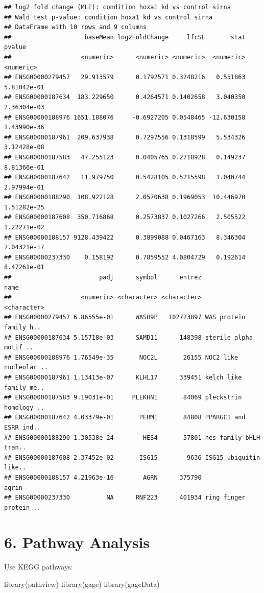 \documentclass[
]{article}
\newenvironment{Shaded}{\begin{snugshade}}{\end{snugshade}}
\newcommand{\FunctionTok}[1]{\textcolor[rgb]{0.00,0.00,0.00}{#1}}
\newcommand{\NormalTok}[1]{#1}
\begin{document}
\begin{verbatim}
## log2 fold change (MLE): condition hoxa1 kd vs control sirna 
## Wald test p-value: condition hoxa1 kd vs control sirna 
## DataFrame with 10 rows and 9 columns
##                    baseMean log2FoldChange     lfcSE       stat      pvalue
##                   <numeric>      <numeric> <numeric>  <numeric>   <numeric>
## ENSG00000279457   29.913579      0.1792571 0.3248216   0.551863 5.81042e-01
## ENSG00000187634  183.229650      0.4264571 0.1402658   3.040350 2.36304e-03
## ENSG00000188976 1651.188076     -0.6927205 0.0548465 -12.630158 1.43990e-36
## ENSG00000187961  209.637938      0.7297556 0.1318599   5.534326 3.12428e-08
## ENSG00000187583   47.255123      0.0405765 0.2718928   0.149237 8.81366e-01
## ENSG00000187642   11.979750      0.5428105 0.5215598   1.040744 2.97994e-01
## ENSG00000188290  108.922128      2.0570638 0.1969053  10.446970 1.51282e-25
## ENSG00000187608  350.716868      0.2573837 0.1027266   2.505522 1.22271e-02
## ENSG00000188157 9128.439422      0.3899088 0.0467163   8.346304 7.04321e-17
## ENSG00000237330    0.158192      0.7859552 4.0804729   0.192614 8.47261e-01
##                        padj      symbol      entrez                   name
##                   <numeric> <character> <character>            <character>
## ENSG00000279457 6.86555e-01      WASH9P   102723897 WAS protein family h..
## ENSG00000187634 5.15718e-03      SAMD11      148398 sterile alpha motif ..
## ENSG00000188976 1.76549e-35       NOC2L       26155 NOC2 like nucleolar ..
## ENSG00000187961 1.13413e-07      KLHL17      339451 kelch like family me..
## ENSG00000187583 9.19031e-01     PLEKHN1       84069 pleckstrin homology ..
## ENSG00000187642 4.03379e-01       PERM1       84808 PPARGC1 and ESRR ind..
## ENSG00000188290 1.30538e-24        HES4       57801 hes family bHLH tran..
## ENSG00000187608 2.37452e-02       ISG15        9636 ISG15 ubiquitin like..
## ENSG00000188157 4.21963e-16        AGRN      375790                  agrin
## ENSG00000237330          NA      RNF223      401934 ring finger protein ..
\end{verbatim}

\hypertarget{pathway-analysis}{%
\section{6. Pathway Analysis}\label{pathway-analysis}}

Use KEGG pathways:

\begin{Shaded}
\begin{Highlighting}[]
\FunctionTok{library}\NormalTok{(pathview)}
\FunctionTok{library}\NormalTok{(gage)}
\FunctionTok{library}\NormalTok{(gageData)}
\end{Highlighting}
\end{Shaded}
\end{document}
